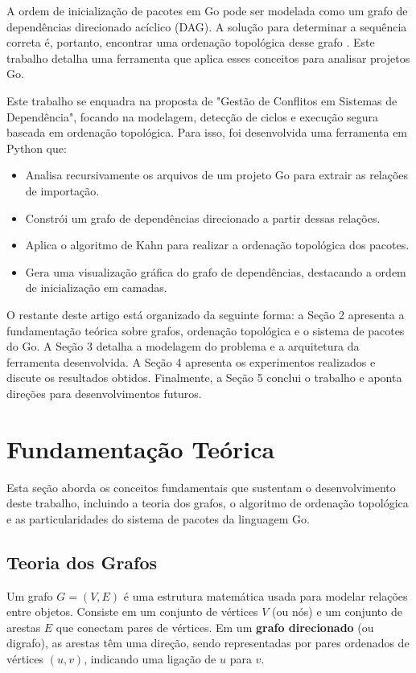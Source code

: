 \documentclass[12pt]{article}
\begin{document}
A ordem de inicialização de pacotes em Go pode ser modelada como um grafo de dependências direcionado acíclico (DAG). A solução para determinar a sequência correta é, portanto, encontrar uma ordenação topológica desse grafo \cite{clrs}. Este trabalho detalha uma ferramenta que aplica esses conceitos para analisar projetos Go.

Este trabalho se enquadra na proposta de "Gestão de Conflitos em Sistemas de Dependência", focando na modelagem, detecção de ciclos e execução segura baseada em ordenação topológica. Para isso, foi desenvolvida uma ferramenta em Python que:
\begin{itemize}
    \item Analisa recursivamente os arquivos de um projeto Go para extrair as relações de importação.
    \item Constrói um grafo de dependências direcionado a partir dessas relações.
    \item Aplica o algoritmo de Kahn para realizar a ordenação topológica dos pacotes.
    \item Gera uma visualização gráfica do grafo de dependências, destacando a ordem de inicialização em camadas.
\end{itemize}

O restante deste artigo está organizado da seguinte forma: a Seção 2 apresenta a fundamentação teórica sobre grafos, ordenação topológica e o sistema de pacotes do Go. A Seção 3 detalha a modelagem do problema e a arquitetura da ferramenta desenvolvida. A Seção 4 apresenta os experimentos realizados e discute os resultados obtidos. Finalmente, a Seção 5 conclui o trabalho e aponta direções para desenvolvimentos futuros.

\section{Fundamentação Teórica}
Esta seção aborda os conceitos fundamentais que sustentam o desenvolvimento deste trabalho, incluindo a teoria dos grafos, o algoritmo de ordenação topológica e as particularidades do sistema de pacotes da linguagem Go.

\subsection{Teoria dos Grafos}
Um grafo $G = (V, E)$ é uma estrutura matemática usada para modelar relações entre objetos. Consiste em um conjunto de vértices $V$ (ou nós) e um conjunto de arestas $E$ que conectam pares de vértices. Em um \textbf{grafo direcionado} (ou digrafo), as arestas têm uma direção, sendo representadas por pares ordenados de vértices $(u, v)$, indicando uma ligação de $u$ para $v$.
\end{document}
